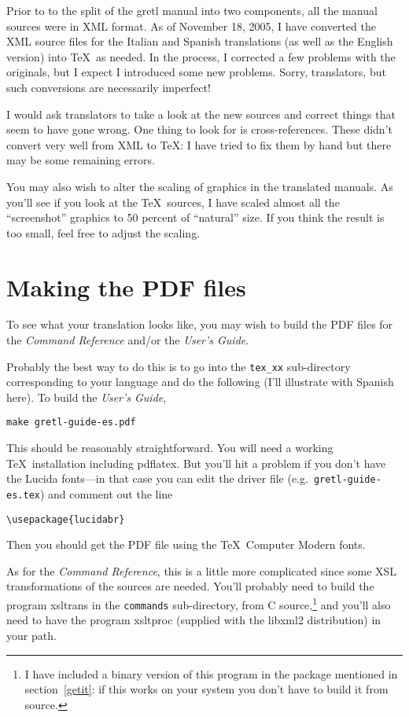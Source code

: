\documentclass{article}
\begin{document}
Prior to to the split of the \textsf{gretl} manual into two
components, all the manual sources were in XML format.  As of November
18, 2005, I have converted the XML source files for the Italian and
Spanish translations (as well as the English version) into \TeX\ as
needed.  In the process, I corrected a few problems with the
originals, but I expect I introduced some new problems.  Sorry,
translators, but such conversions are necessarily imperfect!

I would ask translators to take a look at the new sources and correct
things that seem to have gone wrong.  One thing to look for is
cross-references.  These didn't convert very well from XML to \TeX: I
have tried to fix them by hand but there may be some remaining errors.

You may also wish to alter the scaling of graphics in the translated
manuals.  As you'll see if you look at the \TeX\ sources, I have
scaled almost all the ``screenshot'' graphics to 50 percent of
``natural'' size.  If you think the result is too small, feel free to
adjust the scaling.

\section{Making the PDF files}

To see what your translation looks like, you may wish to build the PDF
files for the \textit{Command Reference} and/or the \textit{User's
  Guide}.

Probably the best way to do this is to go into the \texttt{tex\_xx}
sub-directory corresponding to your language and do the following
(I'll illustrate with Spanish here).  To build the \textit{User's Guide},

\begin{verbatim}
make gretl-guide-es.pdf
\end{verbatim}

This should be reasonably straightforward.  You will need a working
\TeX\ installation including \textsf{pdflatex}.  But you'll hit a
problem if you don't have the \textsf{Lucida} fonts---in that case you
can edit the driver file (e.g.\ \texttt{gretl-guide-es.tex}) and
comment out the line
%
\begin{verbatim}
\usepackage{lucidabr}
\end{verbatim}
%
Then you should get the PDF file using the \TeX\ Computer Modern
fonts.

As for the \textit{Command Reference}, this is a little more
complicated since some XSL transformations of the sources are needed.
You'll probably need to build the program \textsf{xsltrans} in the
\texttt{commands} sub-directory, from C source,\footnote{I have
  included a binary version of this program in the package mentioned
  in section~\ref{getit}: if this works on your system you don't have
  to build it from source.}  and you'll also need to have the program
\textsf{xsltproc} (supplied with the \textsf{libxml2} distribution) in
your path.
\end{document}
